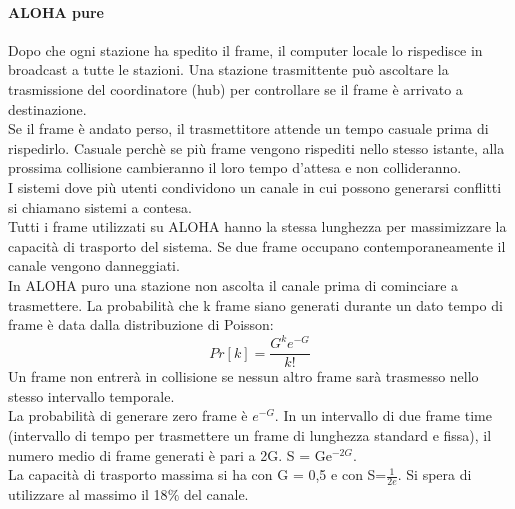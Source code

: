 \documentclass{article}
\begin{document}
\paragraph{ALOHA pure} Dopo che ogni stazione ha spedito il frame, il computer locale lo rispedisce in broadcast a tutte le stazioni. Una stazione trasmittente può ascoltare la trasmissione del coordinatore (hub) per controllare se il frame  è arrivato a destinazione.\\
Se il frame è andato perso, il trasmettitore attende un tempo casuale prima di rispedirlo. Casuale perchè se più frame vengono rispediti nello stesso istante, alla prossima collisione cambieranno il loro tempo d'attesa e non collideranno.\\
I sistemi dove più utenti condividono un canale in cui possono generarsi conflitti si chiamano sistemi a contesa. \\
Tutti i frame utilizzati su ALOHA hanno la stessa lunghezza per massimizzare la capacità di trasporto del sistema. Se due frame occupano contemporaneamente il canale vengono danneggiati.\\
In ALOHA puro una stazione non ascolta il canale prima di cominciare a trasmettere.
La probabilità che k frame siano generati durante un dato tempo di frame è data dalla distribuzione di Poisson:
\begin{equation}
	Pr[k] = \frac{G^k e^{-G}}{k!}
\end{equation}
Un frame non entrerà in collisione se nessun altro frame sarà trasmesso nello stesso intervallo temporale.\\
La probabilità di generare zero frame è $e^{-G}$. In un intervallo di due frame time (intervallo di tempo per trasmettere un frame di lunghezza standard e fissa), il numero medio di frame generati è pari a 2G. S = Ge$^{-2G}$.\\
La capacità di trasporto massima si ha con G = 0,5 e con S=$\frac{1}{2e}$. Si spera di utilizzare al massimo il 18$\%$ del canale.
\end{document}
